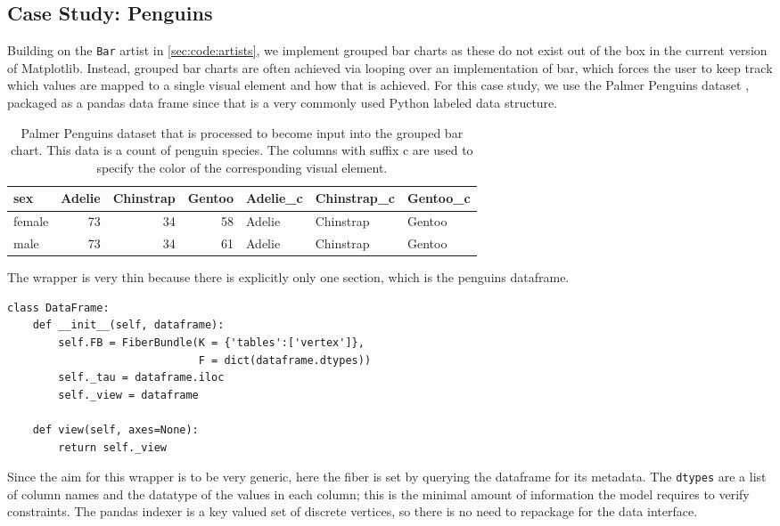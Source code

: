 \documentclass[../main.tex]{subfiles}
\begin{document}
\subsection{Case Study: Penguins}
\label{sec:code_case_study}
Building on the \texttt{Bar} artist in \autoref{sec:code:artists}, we implement grouped bar charts as these do not exist out of the box in the current version of Matplotlib. Instead, grouped bar charts are often achieved via looping over an implementation of bar, which forces the user to keep track which values are mapped to a single visual element and how that is achieved. For this case study, we use the Palmer Penguins dataset \cite{gormanEcologicalSexualDimorphism2014, horstPalmerpenguinsPalmerArchipelago2020}, packaged as a pandas data frame \cite{nakhaeeMcnakhaeePalmerpenguins2021} since that is a very commonly used Python labeled data structure. 

\begin{table}[H]
    \centering
\begin{tabular}{|l|r|r|r|l|l|l|}
    \toprule
       sex &  Adelie &  Chinstrap &  Gentoo & Adelie\_c & Chinstrap\_c & Gentoo\_c \\
    \midrule
     female &      73 &         34 &      58 &   Adelie &   Chinstrap &   Gentoo \\
     male &      73 &         34 &      61 &   Adelie &   Chinstrap &   Gentoo \\
    \bottomrule
\end{tabular}
\caption{Palmer Penguins dataset that is processed to become input into the grouped bar chart. This data is a count of penguin species. The columns with suffix c are used to specify the color of the corresponding visual element.}
\label{tab:code:penguins}
\end{table}
The wrapper is very thin because there is explicitly only one section, which is the penguins dataframe. 
\begin{verbatim}
class DataFrame:
    def __init__(self, dataframe):
        self.FB = FiberBundle(K = {'tables':['vertex']},
                              F = dict(dataframe.dtypes))
        self._tau = dataframe.iloc
        self._view = dataframe

    def view(self, axes=None):
        return self._view
\end{verbatim}
Since the aim for this wrapper is to be very generic, here the fiber is set by querying the dataframe for its metadata. The \texttt{dtypes} are a list of column names and the datatype of the values in each column; this is the minimal amount of information the model requires to verify constraints. The pandas indexer is a key valued set of discrete vertices, so there is no need to repackage for the data interface. 
\end{document}
